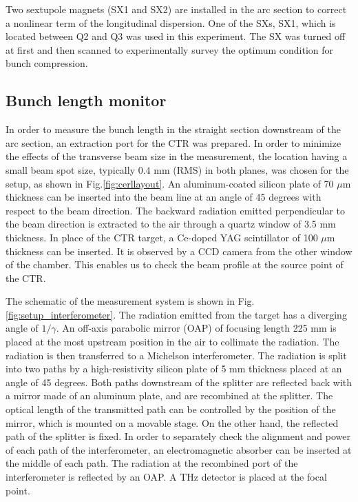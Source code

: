 \documentclass[review]{elsarticle}
\begin{document}
Two sextupole magnets (SX1 and SX2) are installed in the arc section
to correct a nonlinear term of the longitudinal dispersion.
One of the SXs, SX1, which is located between Q2 and Q3 was used 
in this experiment.
The SX was turned off at first
and then scanned 
to experimentally survey the optimum condition for bunch compression.

\subsection{Bunch length monitor}

In order to measure the bunch length 
in the straight section downstream of the arc section,
an extraction port for the CTR was prepared.
In order to minimize the effects of the transverse beam size in the measurement,
the location having a small beam spot size, 
typically $0.4$ mm (RMS) in both planes,
was chosen for the setup, as shown in Fig.\ref{fig:cerllayout}.
An aluminum-coated silicon plate of 70 $\mu$m thickness
can be inserted into the beam line at an angle of 45 degrees with respect to the beam direction.
The backward radiation emitted perpendicular to the beam direction
is extracted to the air through a quartz window of 3.5 mm thickness.
In place of the CTR target,
a Ce-doped YAG scintillator of 100 $\mu$m thickness 
can be inserted.
It is observed by a CCD camera from the other window of the chamber.
This enables us to check the beam profile at the source point of the CTR.


The schematic of the measurement system is shown in Fig.\ref{fig:setup_interferometer}.
The radiation emitted from the target has a diverging angle of $1/\gamma$.
An off-axis parabolic mirror (OAP) of focusing length 225 mm is placed
at the most upstream position in the air to collimate the radiation.
The radiation is then transferred to a Michelson interferometer.
The radiation is split into two paths by 
a high-resistivity silicon plate of 5 mm thickness placed 
at an angle of 45 degrees.
Both paths downstream of the splitter are reflected back with a mirror made of an aluminum plate,
and are recombined at the splitter.
The optical length of the transmitted path can be controlled
by the position of the mirror, which is mounted on a movable stage.
On the other hand, the reflected path of the splitter is fixed.
In order to separately check the alignment and power of each path of the interferometer,
an electromagnetic absorber can be inserted at the middle of each path.
The radiation at the recombined port of the interferometer
is reflected by an OAP.
A THz detector is placed at the focal point. 
\end{document}
